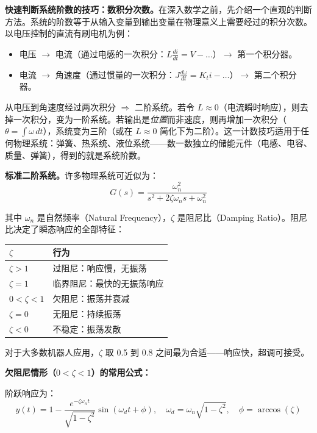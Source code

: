\textbf{快速判断系统阶数的技巧：数积分次数。}在深入数学之前，先介绍一个直观的判断方法。系统的阶数等于从输入变量到输出变量在物理意义上需要经过的积分次数。以电压控制的直流有刷电机为例：
\begin{itemize}[nosep]
    \item 电压 $\to$ 电流（通过电感的一次积分：$L\frac{di}{dt} = V - \ldots$）$\to$ 第一个积分器。
    \item 电流 $\to$ 角速度（通过惯量的一次积分：$J\frac{d\omega}{dt} = K_t i - \ldots$）$\to$ 第二个积分器。
\end{itemize}
从电压到角速度经过两次积分 $\Rightarrow$ 二阶系统。若令 $L \approx 0$（电流瞬时响应），则去掉一次积分，变为一阶系统。若输出是\textit{位置}而非速度，则再增加一次积分（$\theta = \int \omega\,dt$），系统变为三阶（或在 $L \approx 0$ 简化下为二阶）。这一计数技巧适用于任何物理系统：弹簧、热系统、液位系统——数一数独立的储能元件（电感、电容、质量、弹簧），得到的就是系统阶数。

\textbf{标准二阶系统。}许多物理系统可近似为：
\begin{equation}
G(s) = \frac{\omega_n^2}{s^2 + 2\zeta\omega_n s + \omega_n^2}
\end{equation}

其中 $\omega_n$ 是自然频率（Natural Frequency），$\zeta$ 是阻尼比（Damping Ratio）。阻尼比决定了瞬态响应的全部特征：

\begin{center}
\begin{tabular}{ll}
\toprule
$\zeta$ & \textbf{行为} \\
\midrule
$\zeta > 1$ & 过阻尼：响应慢，无振荡 \\
$\zeta = 1$ & 临界阻尼：最快的无振荡响应 \\
$0 < \zeta < 1$ & 欠阻尼：振荡并衰减 \\
$\zeta = 0$ & 无阻尼：持续振荡 \\
$\zeta < 0$ & 不稳定：振荡发散 \\
\bottomrule
\end{tabular}
\end{center}

对于大多数机器人应用，$\zeta$ 取 0.5 到 0.8 之间最为合适——响应快，超调可接受。

\textbf{欠阻尼情形（$0 < \zeta < 1$）的常用公式：}

阶跃响应为：
\begin{equation}
y(t) = 1 - \frac{e^{-\zeta\omega_n t}}{\sqrt{1 - \zeta^2}} \sin\left(\omega_d t + \phi\right), \quad \omega_d = \omega_n\sqrt{1 - \zeta^2}, \quad \phi = \arccos(\zeta)
\end{equation}

